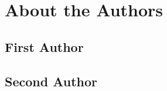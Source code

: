 \chapter{About the Authors}

\section{First Author}

\blindtext

\section{Second Author}

\blindtext